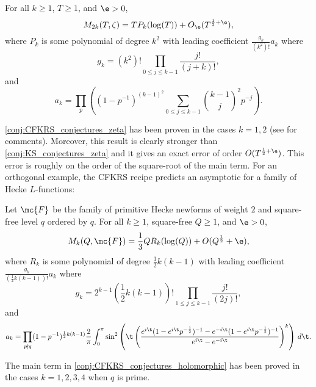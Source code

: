   \begin{conjecture}\label{conj:CFKRS_conjectures_zeta}
    For all $k \ge 1$, $T \ge 1$, and $\e > 0$,
    \[
      M_{2k}(T,\zeta) = TP_{k}(\log(T))+O_{\e}(T^{\frac{1}{2}+\e}),
    \]
    where $P_{k}$ is some polynomial of degree $k^{2}$ with leading coefficient $\frac{g_{k}}{(k^{2})!}a_{k}$ where
    \[
      g_{k} = (k^{2})!\prod_{0 \le j \le k-1}\frac{j!}{(j+k)!},
    \]
    and
    \[
      a_{k} = \prod_{p}\left((1-p^{-1})^{(k-1)^{2}}\sum_{0 \le j \le k-1}\binom{k-1}{j}^{2}p^{-j}\right).
    \]
  \end{conjecture}

  \cref{conj:CFKRS_conjectures_zeta} has been proven in the cases $k = 1,2$ (see \cite{conrey2005integral} for comments). Moreover, this result is clearly stronger than \cref{conj:KS_conjectures_zeta} and it gives an exact error of order $O(T^{\frac{1}{2}+\e})$. This error is roughly on the order of the square-root of the main term. For an orthogonal example, the CFKRS recipe predicts an asymptotic for a family of Hecke $L$-functions:

  \begin{conjecture}\label{conj:CFKRS_conjectures_holomorphic}
    Let $\mc{F}$ be the family of primitive Hecke newforms of weight $2$ and square-free level $q$ ordered by $q$. For all $k \ge 1$, square-free $Q \ge 1$, and $\e > 0$,
    \[
      M_{k}(Q,\mc{F}) = \frac{1}{3}QR_{k}(\log(Q))+O(Q^{\frac{1}{2}}+\e),
    \]
    where $R_{k}$ is some polynomial of degree $\frac{1}{2}k(k-1)$ with leading coefficient $\frac{g_{k}}{\left(\frac{1}{2}k(k-1)\right)!}a_{k}$ where
    \[
      g_{k} = 2^{k-1}\left(\frac{1}{2}k(k-1)\right)!\prod_{1 \le j \le k-1}\frac{j!}{(2j)!},
    \]
    and
    \[
      a_{k} = \prod_{p \nmid q}(1-p^{-1})^{\frac{1}{2}k(k-1)}\frac{2}{\pi}\int_{0}^{\pi}\sin^{2}\left(\t\left(\frac{e^{i\t}(1-e^{i\t}p^{-\frac{1}{2}})^{-1}-e^{-i\t}(1-e^{i\t}p^{-\frac{1}{2}})^{-1}}{e^{i\t}-e^{-i\t}}\right)^{k}\right)\,d\t.
    \]
  \end{conjecture}

  The main term in \cref{conj:CFKRS_conjectures_holomorphic} has been proved in the cases $k = 1,2,3,4$ when $q$ is prime.